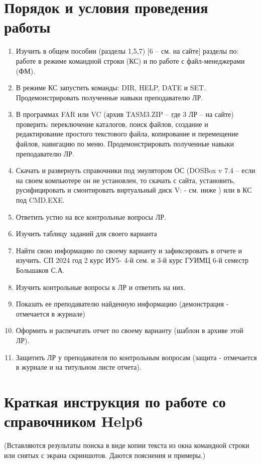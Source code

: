 \documentclass[bachelor,subf,12pt]{disser}
\begin{document}
\section{Порядок и условия проведения работы}
\begin{enumerate}
    \item Изучить в общем пособии (разделы 1,5,7) [6 – см. на сайте] разделы по: работе в режиме
          командной строки (КС) и по работе с файл-менеджерами (ФМ).
    \item В режиме КС запустить команды: DIR, HELP, DATE и SET. Продемонстрировать полученные
          навыки преподавателю ЛР.
    \item В программах FAR или VC (архив TASM3.ZIP – где 3 ЛР – на сайте) проверить: переключение
          каталогов, поиск файлов, создание и редактирование простого текстового файла, копирование
          и перемещение файлов, навигацию по меню. Продемонстрировать полученные навыки преподавателю ЛР.
    \item Скачать и развернуть справочники под эмулятором ОС (DOSBox v 7.4 – если на своем компьютере
          он не установлен, то скачать с сайта, установить, русифицировать и смонтировать виртуальный диск V:
          - см. ниже ) или в КС под CMD.EXE.
    \item Ответить устно на все контрольные вопросы ЛР.
    \item Изучить таблицу заданий для своего варианта
    \item Найти свою информацию по своему варианту и зафиксировать в отчете и изучить.
          СП 2024 год 2 курс ИУ5- 4-й сем. и 3-й курс ГУИМЦ 6-й семестр Большаков С.А.
    \item Изучить контрольные вопросы к ЛР и ответить на них.
    \item Показать ее преподавателю найденную информацию (демонстрация - отмечается в журнале)
    \item Оформить и распечатать отчет по своему варианту (шаблон в архиве этой ЛР).
    \item Защитить ЛР у преподавателя по контрольным вопросам (защита - отмечается в журнале
          и на титульном листе отчета).
\end{enumerate}

\section{Краткая инструкция по работе со справочником Help6}
 (Вставляются результаты поиска в виде копии текста из окна командной строки или снятых с
 экрана скриншотов. Даются пояснения и примеры.)
\end{document}
